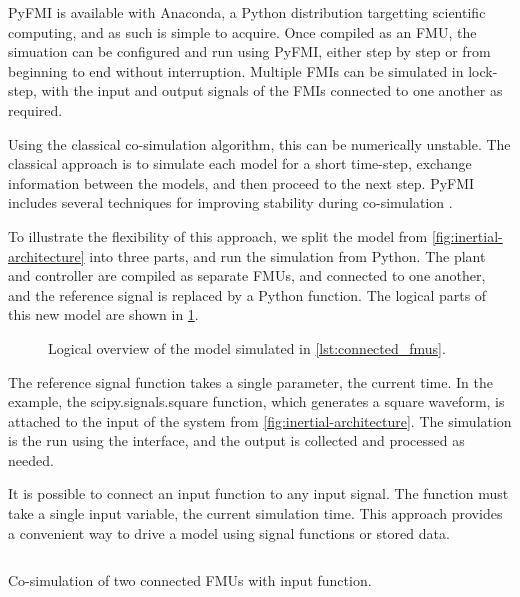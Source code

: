 \documentclass[\rootfolder/main.tex]{subfiles}
\begin{document}
PyFMI is available with Anaconda, a Python distribution targetting scientific computing, and as such is simple to acquire.
Once compiled as an FMU, the simuation can be configured and run using PyFMI, either step by step or from beginning to end without interruption.
Multiple FMIs can be simulated in lock-step, with the input and output signals of the FMIs connected to one another as required.

Using the classical co-simulation algorithm, this can be numerically unstable.
The classical approach is to simulate each model for a short time-step, exchange information between the models, and then proceed to the next step.
PyFMI includes several techniques for improving stability during co-simulation \cite{Andersson2016}.


To illustrate the flexibility of this approach, we split the model from \cref{fig:inertial-architecture} into three parts, and run the simulation from Python.
The plant and controller are compiled as separate FMUs, and connected to one another, and the reference signal is replaced by a Python function.
The logical parts of this new model are shown in \cref{fig:connected_fmus}.

\begin{figure}[ht]
    \caption{Logical overview of the model simulated in \cref{lst:connected_fmus}.\label{fig:connected_fmus}}
\end{figure}

The reference signal function takes a single parameter, the current time.
In the example, the scipy.signals.square function, which generates a square waveform, is attached to the input of the system from \cref{fig:inertial-architecture}.
The simulation is the run using the interface, and the output is collected and processed as needed.

It is possible to connect an input function to any input signal.
The function must take a single input variable, the current simulation time.
This approach provides a convenient way to drive a model using signal functions or stored data.

\begin{listing}[ht]
    \inputminted[fontsize=\footnotesize, firstline=3, lastline=28]{Python}{\rootfolder/Chapters/Chapter2/Listings/simulate.py}
    \caption{Co-simulation of two connected FMUs with input function.\label{lst:connected_fmus}}
\end{listing}
\end{document}
